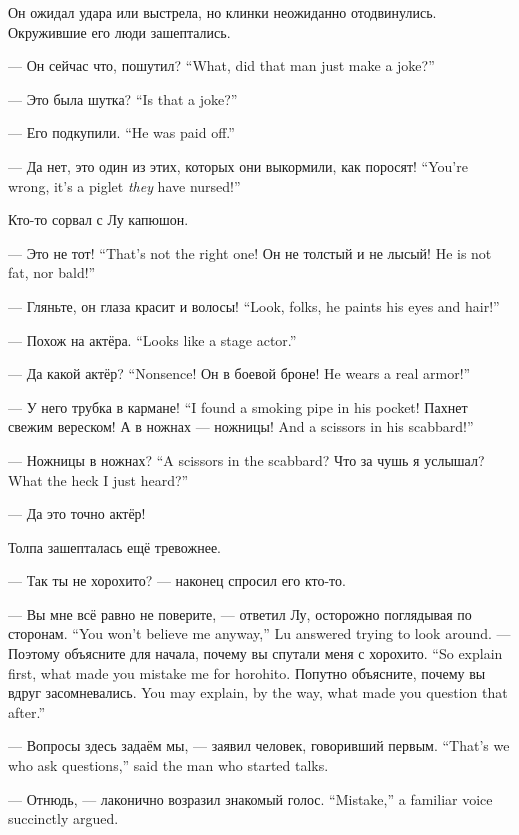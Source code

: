 Он ожидал удара или выстрела, но клинки неожиданно отодвинулись.
Окружившие его люди зашептались.

{--- Он сейчас что, пошутил?}
{``What, did that man just make a joke?''}

{--- Это была шутка?}
{``Is that a joke?''}

{--- Его подкупили.}
{``He was paid off.''}

{--- Да нет, это один из этих, которых они выкормили, как поросят!}
{``You're wrong, it's a piglet \emph{they} have nursed!''}

Кто-то сорвал с Лу капюшон.

{--- Это не тот!}
{``That's not the right one!}
{Он не толстый и не лысый!}
{He is not fat, nor bald!''}

{--- Гляньте, он глаза красит и волосы!}
{``Look, folks, he paints his eyes and hair!''}

{--- Похож на актёра.}
{``Looks like a stage actor.''}

{--- Да какой актёр?}
{``Nonsence!}
{Он в боевой броне!}
{He wears a real armor!''}

{--- У него трубка в кармане!}
{``I found a smoking pipe in his pocket!}
Пахнет свежим вереском!
{А в ножнах --- ножницы!}
{And a scissors in his scabbard!''}

{--- Ножницы в ножнах?}
{``A scissors in the scabbard?}
{Что за чушь я услышал?}
{What the heck I just heard?''}

--- Да это точно актёр!

Толпа зашепталась ещё тревожнее.

--- Так ты не хорохито? --- наконец спросил его кто-то.

{--- Вы мне всё равно не поверите, --- ответил Лу, осторожно поглядывая по сторонам.}
{``You won't believe me anyway,'' Lu answered trying to look around.}
{--- Поэтому объясните для начала, почему вы спутали меня с хорохито.}
{``So explain first, what made you mistake me for horohito.}
{Попутно объясните, почему вы вдруг засомневались.}
{You may explain, by the way, what made you question that after.''}

{--- Вопросы здесь задаём мы, --- заявил человек, говоривший первым.}
{``That's we who ask questions,'' said the man who started talks.}

{--- Отнюдь, --- лаконично возразил знакомый голос.}
{``Mistake,'' a familiar voice succinctly argued.}

